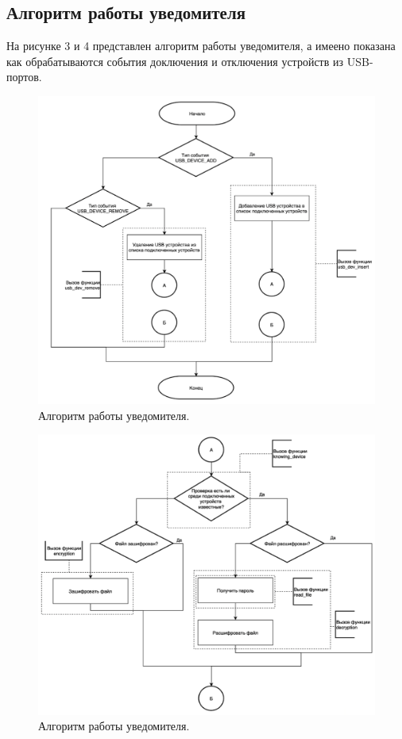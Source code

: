 \documentclass[a4paper, 10pt]{article}
\begin{document}
	\subsection{Алгоритм работы уведомителя}
	На рисунке 3 и 4 представлен алгоритм работы уведомителя, а имеено показана как обрабатываются события доключения и отключения устройств из USB-портов.
	\clearpage
	\newpage
	\begin{figure}[t!]
		\centering
		\includegraphics[scale=0.49]{graph1}
		\centering\caption{Алгоритм работы уведомителя.}
	\end{figure}
	\clearpage
	\newpage
	\begin{figure}[t!]
		\centering
		\includegraphics[scale=0.48]{graph2}
		\centering\caption{Алгоритм работы уведомителя.}
	\end{figure}
\end{document}
